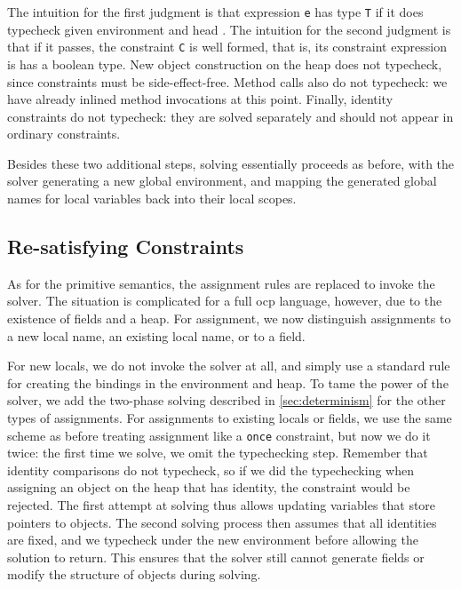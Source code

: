 
The intuition for the first judgment is that expression \texttt{e} has type
\texttt{T} if it does typecheck given environment \Env and head \Heap. The
intuition for the second judgment is that if it passes, the constraint
\texttt{C} is well formed, that is, its constraint expression is has a boolean
type. New object construction on the heap does not typecheck, since constraints
must be side-effect-free. Method calls also do not typecheck: we have already
inlined method invocations at this point. Finally, identity constraints do not
typecheck: they are solved separately and should not appear in ordinary
constraints.

Besides these two additional steps, solving essentially proceeds as before, with
the solver generating a new global environment, and mapping the generated global
names for local variables back into their local scopes.

\subsection{Re-satisfying Constraints}

As for the primitive semantics, the assignment rules are replaced to invoke the
solver. The situation is complicated for a full \ac{ocp} language, however, due
to the existence of fields and a heap. For assignment, we now distinguish
assignments to a new local name, an existing local name, or to a field.

For new locals, we do not invoke the solver at all, and simply use a standard
rule for creating the bindings in the environment and heap. To tame the power of
the solver, we add the two-phase solving described in \autoref{sec:determinism} for
the other types of assignments. For assignments to existing locals or fields,
we use the same scheme as before treating assignment like a \verb!once!
constraint, but now we do it twice: the first time we solve, we omit the
typechecking step. Remember that identity comparisons do not typecheck, so if we
did the typechecking when assigning an object on the heap that has identity, the
constraint would be rejected. The first attempt at solving thus allows updating
variables that store pointers to objects. The second solving process then
assumes that all identities are fixed, and we typecheck under the new
environment before allowing the solution to return. This ensures that the solver
still cannot generate fields or modify the structure of objects during solving.

